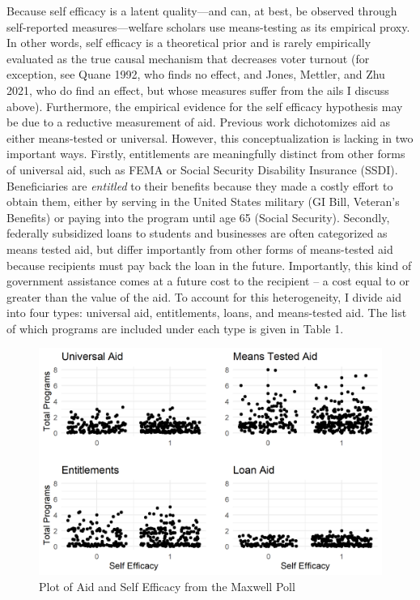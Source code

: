 \documentclass[12pt]{paper}
\begin{document}
Because self efficacy is a latent quality—and can, at best, be observed through self-reported measures—welfare scholars use means-testing as its empirical proxy. In other words, self efficacy is a theoretical prior and is rarely empirically evaluated as the true causal mechanism that decreases voter turnout (for exception, see Quane 1992, who finds no effect, and Jones, Mettler, and Zhu 2021, who do find an effect, but whose measures suffer from the ails I discuss above). Furthermore, the empirical evidence for the self efficacy hypothesis may be due to a reductive measurement of aid. Previous work dichotomizes aid as either means-tested or universal. However, this conceptualization is lacking in two important ways. Firstly, entitlements are meaningfully distinct from other forms of universal aid, such as FEMA or Social Security Disability Insurance (SSDI). Beneficiaries are \textit{entitled} to their benefits because they made a costly effort to obtain them, either by serving in the United States military (GI Bill, Veteran's Benefits) or paying into the program until age 65 (Social Security). Secondly, federally subsidized loans to students and businesses are often categorized as means tested aid, but differ importantly from other forms of means-tested aid because recipients must pay back the loan in the future. Importantly, this kind of government assistance comes at a future cost to the recipient – a cost equal to or greater than the value of the aid. To account for this heterogeneity, I divide aid into four types: universal aid, entitlements, loans, and means-tested aid. The list of which programs are included under each type is given in Table 1.

\begin{figure} \centering
	\includegraphics[width=.8\linewidth]{Figs/scatter_SE.png}
	\caption{Plot of Aid and Self Efficacy from the Maxwell Poll}
	\label{}
\end{figure}
\end{document}
